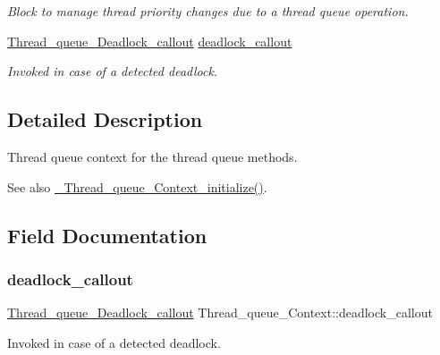 \begin{DoxyCompactItemize}
\begin{tabbing}
\end{tabbing}\begin{DoxyCompactList}\small\item\em Block to manage thread priority changes due to a thread queue operation. \end{DoxyCompactList}\item 
\mbox{\hyperlink{group__RTEMSScoreThreadQueue_gab2878c08655ad0911fe6540a1adaf3a3}{Thread\+\_\+queue\+\_\+\+Deadlock\+\_\+callout}} \mbox{\hyperlink{structThread__queue__Context_a2bf1488ae2e5e0c116cebe5fef3f5f9a}{deadlock\+\_\+callout}}
\begin{DoxyCompactList}\small\item\em Invoked in case of a detected deadlock. \end{DoxyCompactList}\end{DoxyCompactItemize}


\subsection{Detailed Description}
Thread queue context for the thread queue methods. 

\begin{DoxySeeAlso}{See also}
\mbox{\hyperlink{group__RTEMSScoreThreadQueue_gae18ee06777084a67d286d743355d47ac}{\+\_\+\+Thread\+\_\+queue\+\_\+\+Context\+\_\+initialize()}}. 
\end{DoxySeeAlso}


\subsection{Field Documentation}
\mbox{\label{structThread__queue__Context_a2bf1488ae2e5e0c116cebe5fef3f5f9a}} 
\subsubsection{\texorpdfstring{deadlock\_callout}{deadlock\_callout}}
{\footnotesize\ttfamily \mbox{\hyperlink{group__RTEMSScoreThreadQueue_gab2878c08655ad0911fe6540a1adaf3a3}{Thread\+\_\+queue\+\_\+\+Deadlock\+\_\+callout}} Thread\+\_\+queue\+\_\+\+Context\+::deadlock\+\_\+callout}



Invoked in case of a detected deadlock. 

